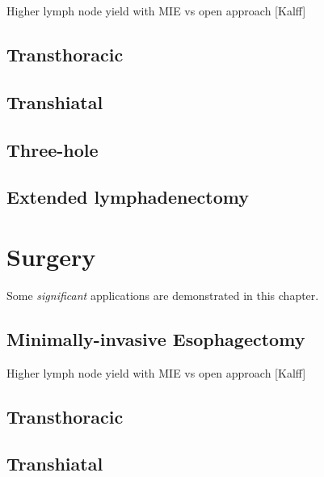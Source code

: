\documentclass[
]{book}
\begin{document}
Higher lymph node yield with MIE vs open approach {[}Kalff{]}

\hypertarget{transthoracic-2}{%
\section{Transthoracic}\label{transthoracic-2}}

\hypertarget{transhiatal-2}{%
\section{Transhiatal}\label{transhiatal-2}}

\hypertarget{three-hole-2}{%
\section{Three-hole}\label{three-hole-2}}

\hypertarget{extended-lymphadenectomy-2}{%
\section{Extended lymphadenectomy}\label{extended-lymphadenectomy-2}}

\hypertarget{surgery-3}{%
\chapter{Surgery}\label{surgery-3}}

Some \emph{significant} applications are demonstrated in this chapter.

\hypertarget{minimally-invasive-esophagectomy-4}{%
\section{Minimally-invasive Esophagectomy}\label{minimally-invasive-esophagectomy-4}}

Higher lymph node yield with MIE vs open approach {[}Kalff{]}

\hypertarget{transthoracic-3}{%
\section{Transthoracic}\label{transthoracic-3}}

\hypertarget{transhiatal-3}{%
\section{Transhiatal}\label{transhiatal-3}}
\end{document}

